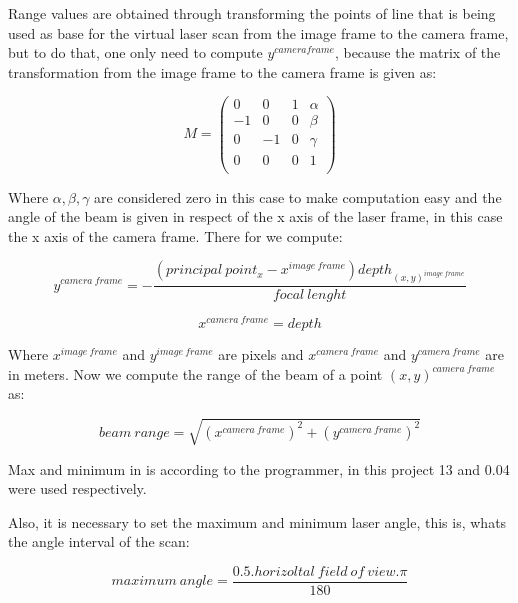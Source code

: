 \documentclass[10pt,a4paper,final]{report}
\begin{document}
Range values are obtained through transforming the points of line that is being used as base for the virtual laser scan from the image frame to the camera frame, but to do that, one only need to compute $y^{camera frame}$, because the matrix of the transformation from the image frame to the camera frame is given as:

\begin{equation}
M=
  \begin{pmatrix}
    0 & 0 & 1 & \alpha\\
    -1 & 0 & 0 & \beta\\
    0 & -1 & 0 & \gamma\\
    0 & 0 & 0 & 1\\
  \end{pmatrix}
\end{equation}

Where $\alpha, \beta, \gamma$ are considered zero in this case to make computation easy and the angle of the beam is given in respect of the x axis of the laser frame, in this case the x axis of the camera frame.  There for we compute:

\begin{equation}
y^{camera \ frame} = - \frac{(principal \ point_{x} - x^{image \ frame})depth_{(x, y)^{image \ frame}}}{focal \ lenght}
\end{equation}

\begin{equation}
x^{camera \ frame} = depth
\end{equation}

Where $x^{image \ frame}$ and $y^{image \ frame}$ are pixels and $x^{camera \ frame}$ and $y^{camera \ frame}$ are in meters. Now we compute the range of the beam of a point $(x, y)^{camera \ frame}$ as:

\begin{equation}
beam \ range = \sqrt{(x^{camera \ frame})^2 + (y^{camera \ frame})^2 } 
\end{equation}

Max and minimum in is according to the programmer, in this project 13 and 0.04 were used respectively.

Also, it is necessary to set the maximum and minimum laser angle, this is, whats the angle interval of the scan:

\begin{equation}
maximum \ angle = \frac{0.5.horizoltal \ field \ of  \ view. \pi}{180}
\end{equation} 
\end{document}
